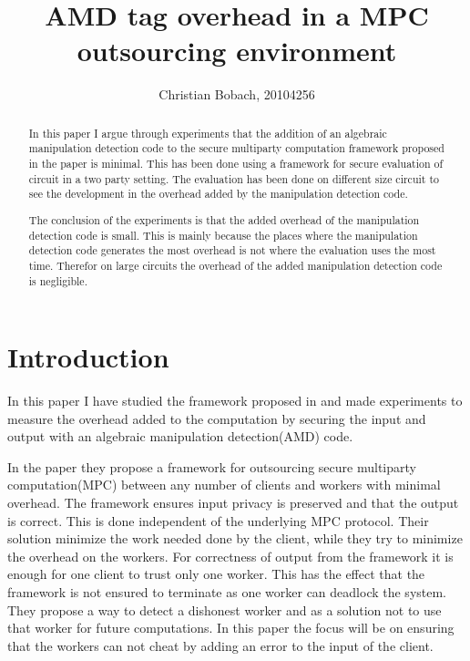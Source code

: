 \documentclass[10pt,a4paper]{article}
\author{Christian Bobach, 20104256}
\title{AMD tag overhead in a MPC outsourcing environment}
\newcommand{\todo}[1]{}
\renewcommand{\todo}[1]{{\color{red} TODO: {#1}} \\}
\begin{document}
\maketitle

\begin{abstract}
In this paper I argue through experiments that the addition of an algebraic manipulation detection code to the secure multiparty computation framework proposed in the paper \cite{fosc} is minimal. This has been done using a framework for secure evaluation of circuit in a two party setting. The evaluation has been done on different size circuit to see the development in the overhead added by the manipulation detection code.

The conclusion of the experiments is that the added overhead of the manipulation detection code is small. This is mainly because the places where the manipulation detection code generates the most overhead is not where the evaluation uses the most time. Therefor on large circuits the overhead of the added manipulation detection code is negligible.
\end{abstract}

\tableofcontents
\pagebreak

\section{Introduction}
In this paper I have studied the framework proposed in \cite{fosc} and made experiments to measure the overhead added to the computation by securing the input and output with an algebraic manipulation detection(AMD) code.

In the paper they propose a framework for outsourcing secure multiparty computation(MPC) between any number of clients and workers with minimal overhead. The framework ensures input privacy is preserved and that the output is correct. This is done independent of the underlying MPC protocol. Their solution minimize the work needed done by the client, while they try to minimize the overhead on the workers. For correctness of output from the framework it is enough for one client to trust only one worker. This has the effect that the framework is not ensured to terminate as one worker can deadlock the system. They propose a way to detect a dishonest worker and as a solution not to use that worker for future computations. In this paper the focus will be on ensuring that the workers can not cheat by adding an error to the input of the client.
\end{document}
